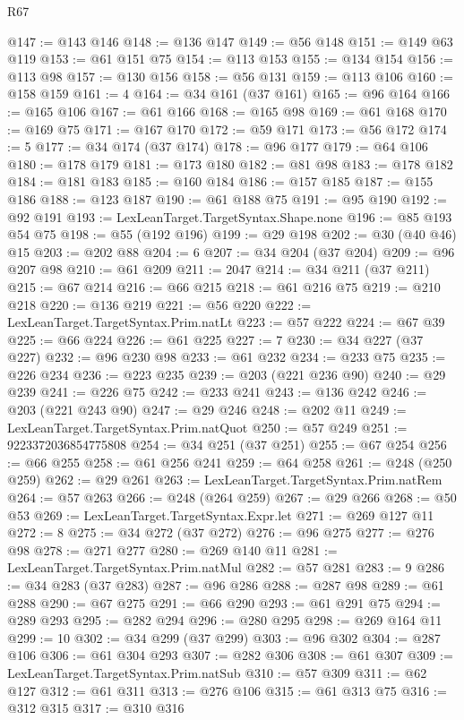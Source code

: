 \begin{lexlean}{R67}
\begin{coremodule}
@147 := @143 @146
@148 := @136 @147
@149 := @56 @148
@151 := @149 @63 @119
@153 := @61 @151 @75
@154 := @113 @153
@155 := @134 @154
@156 := @113 @98
@157 := @130 @156
@158 := @56 @131
@159 := @113 @106
@160 := @158 @159
@161 := 4
@164 := @34 @161 (@37 @161)
@165 := @96 @164
@166 := @165 @106
@167 := @61 @166
@168 := @165 @98
@169 := @61 @168
@170 := @169 @75
@171 := @167 @170
@172 := @59 @171
@173 := @56 @172
@174 := 5
@177 := @34 @174 (@37 @174)
@178 := @96 @177
@179 := @64 @106
@180 := @178 @179
@181 := @173 @180
@182 := @81 @98
@183 := @178 @182
@184 := @181 @183
@185 := @160 @184
@186 := @157 @185
@187 := @155 @186
@188 := @123 @187
@190 := @61 @188 @75
@191 := @95 @190
@192 := @92 @191
@193 := LexLeanTarget.TargetSyntax.Shape.none
@196 := @85 @193 @54 @75
@198 := @55 (@192 @196)
@199 := @29 @198
@202 := @30 (@40 @46) @15
@203 := @202 @88
@204 := 6
@207 := @34 @204 (@37 @204)
@209 := @96 @207 @98
@210 := @61 @209
@211 := 2047
@214 := @34 @211 (@37 @211)
@215 := @67 @214
@216 := @66 @215
@218 := @61 @216 @75
@219 := @210 @218
@220 := @136 @219
@221 := @56 @220
@222 := LexLeanTarget.TargetSyntax.Prim.natLt
@223 := @57 @222
@224 := @67 @39
@225 := @66 @224
@226 := @61 @225
@227 := 7
@230 := @34 @227 (@37 @227)
@232 := @96 @230 @98
@233 := @61 @232
@234 := @233 @75
@235 := @226 @234
@236 := @223 @235
@239 := @203 (@221 @236 @90)
@240 := @29 @239
@241 := @226 @75
@242 := @233 @241
@243 := @136 @242
@246 := @203 (@221 @243 @90)
@247 := @29 @246
@248 := @202 @11
@249 := LexLeanTarget.TargetSyntax.Prim.natQuot
@250 := @57 @249
@251 := 9223372036854775808
@254 := @34 @251 (@37 @251)
@255 := @67 @254
@256 := @66 @255
@258 := @61 @256 @241
@259 := @64 @258
@261 := @248 (@250 @259)
@262 := @29 @261
@263 := LexLeanTarget.TargetSyntax.Prim.natRem
@264 := @57 @263
@266 := @248 (@264 @259)
@267 := @29 @266
@268 := @50 @53
@269 := LexLeanTarget.TargetSyntax.Expr.let
@271 := @269 @127 @11
@272 := 8
@275 := @34 @272 (@37 @272)
@276 := @96 @275
@277 := @276 @98
@278 := @271 @277
@280 := @269 @140 @11
@281 := LexLeanTarget.TargetSyntax.Prim.natMul
@282 := @57 @281
@283 := 9
@286 := @34 @283 (@37 @283)
@287 := @96 @286
@288 := @287 @98
@289 := @61 @288
@290 := @67 @275
@291 := @66 @290
@293 := @61 @291 @75
@294 := @289 @293
@295 := @282 @294
@296 := @280 @295
@298 := @269 @164 @11
@299 := 10
@302 := @34 @299 (@37 @299)
@303 := @96 @302
@304 := @287 @106
@306 := @61 @304 @293
@307 := @282 @306
@308 := @61 @307
@309 := LexLeanTarget.TargetSyntax.Prim.natSub
@310 := @57 @309
@311 := @62 @127
@312 := @61 @311
@313 := @276 @106
@315 := @61 @313 @75
@316 := @312 @315
@317 := @310 @316

\end{coremodule}
\end{lexlean}
